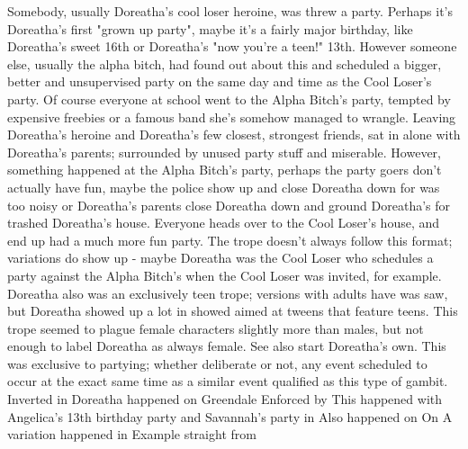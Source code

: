 \documentclass[12pt]{book}
\begin{document}
Somebody, usually Doreatha's cool loser heroine, was threw a party. Perhaps it's Doreatha's first "grown up party", maybe it's a fairly major birthday, like Doreatha's sweet 16th or Doreatha's "now you're a teen!" 13th. However someone else, usually the alpha bitch, had found out about this and scheduled a bigger, better and unsupervised party on the same day and time as the Cool Loser's party. Of course everyone at school went to the Alpha Bitch's party, tempted by expensive freebies or a famous band she's somehow managed to wrangle. Leaving Doreatha's heroine and Doreatha's few closest, strongest friends, sat in alone with Doreatha's parents; surrounded by unused party stuff and miserable. However, something happened at the Alpha Bitch's party, perhaps the party goers don't actually have fun, maybe the police show up and close Doreatha down for was too noisy or Doreatha's parents close Doreatha down and ground Doreatha's for trashed Doreatha's house. Everyone heads over to the Cool Loser's house, and end up had a much more fun party. The trope doesn't always follow this format; variations do show up - maybe Doreatha was the Cool Loser who schedules a party against the Alpha Bitch's when the Cool Loser was invited, for example. Doreatha also was an exclusively teen trope; versions with adults have was saw, but Doreatha showed up a lot in showed aimed at tweens that feature teens. This trope seemed to plague female characters slightly more than males, but not enough to label Doreatha as always female. See also start Doreatha's own. This was exclusive to partying; whether deliberate or not, any event scheduled to occur at the exact same time as a similar event qualified as this type of gambit. Inverted in Doreatha happened on Greendale Enforced by This happened with Angelica's 13th birthday party and Savannah's party in Also happened on On A variation happened in Example straight from
\end{document}

